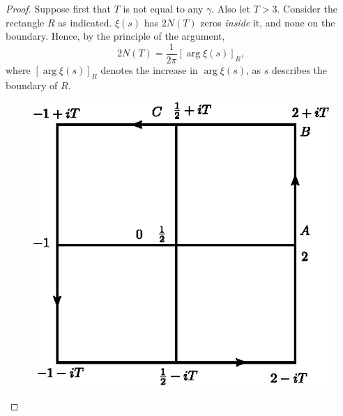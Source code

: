 \begin{proof}
Suppose first that $T$ is not equal to any $\gamma$. Also let $T
>3$. Consider the rectangle $R$ as indicated. $\xi(s)$ has $2N(T)$
zeros \textit{inside} it, and none on the boundary. Hence, by the
principle of the argument,
$$
2N(T) = \frac{1}{2\pi} [\arg \xi (s)]_R,
$$ 
where $[\arg \xi (s)]_R$ denotes the increase in $\arg\xi(s)$, as $s$
describes the boundary of $R$.
\begin{figure}[H]
\centering
\includegraphics{figures/fig14.1.eps}
\end{figure}


\end{proof}
